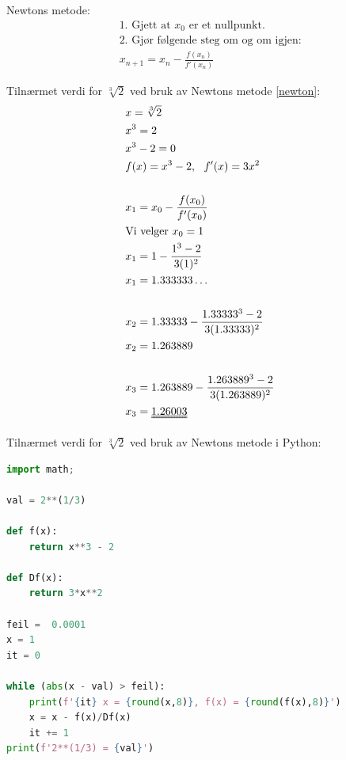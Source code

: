 

\oppgaveDelStart
{}

Newtons metode:
\begin{equation}
\label{newton}
\begin{split}
&\text{1. Gjett at $x_0$ er et nullpunkt.}\\
&\text{2. Gjør følgende steg om og om igjen:}\\
&x_{n+1} = x_n - \frac{f(x_n)}{f'(x_n)}
\end{split}
\end{equation}

\vspace{0.5cm}

Tilnærmet verdi for $\sqrt[3]{2}$ ved bruk av Newtons metode \eqref{newton}:
\begin{align*}
&x = \sqrt[3]{2}&\\
&x^3 = 2\\
&x^3-2 = 0\\
&f(x) = x^3 - 2, \ \ f'(x) = 3x^2\\\\
&x_1 = x_0 - \frac{f(x_0)}{f'(x_0)}\\
&\text{Vi velger } x_0 = 1\\
&x_1 = 1 - \frac{1^3 - 2}{3(1)^2}\\
&x_1 = 1.333333\dots\\\\
&x_2 = 1.33333 - \frac{1.33333^3 - 2}{3(1.33333)^2}\\
&x_2 = 1.263889\\\\
&x_3 = 1.263889 - \frac{1.263889^3 - 2}{3(1.263889)^2}\\
&x_3 = \uuline{1.26003}
\end{align*}

\newpage
Tilnærmet verdi for $\sqrt[3]{2}$ ved bruk av Newtons metode i Python:
\vspace{0.5cm}
\begin{lstlisting}[language=Python]
import math;

val = 2**(1/3)

def f(x):
    return x**3 - 2

def Df(x):
    return 3*x**2

feil =  0.0001
x = 1
it = 0

while (abs(x - val) > feil):
    print(f'{it} x = {round(x,8)}, f(x) = {round(f(x),8)}')
    x = x - f(x)/Df(x)
    it += 1
print(f'2**(1/3) = {val}')

\end{lstlisting}

